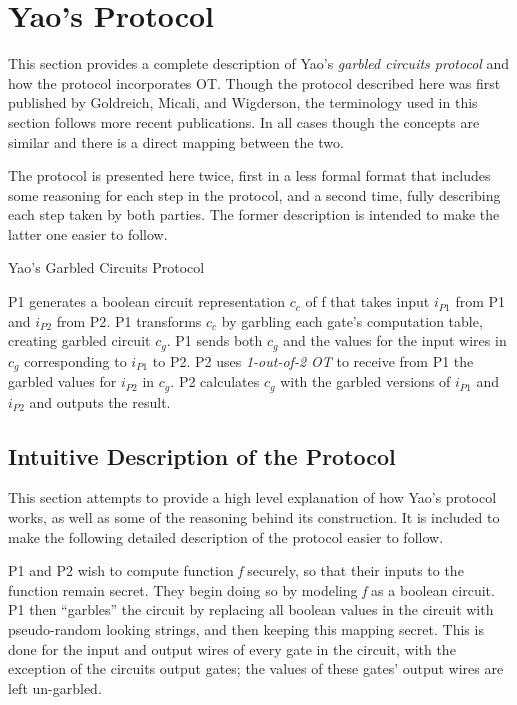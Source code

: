 \section{Yao's Protocol}
\label{sec:protocol}

This section provides a complete description of Yao's \emph{garbled circuits protocol} and how the protocol incorporates \ac{OT}.  Though the protocol described here was first published by Goldreich, Micali, and Wigderson\cite{goldreich1987play}, the terminology used in this section follows more recent publications\cite{hazay2010efficient}. In all cases though the concepts are similar and there is a direct mapping between the two.

The protocol is presented here twice, first in a less formal format that includes some reasoning for each step in the protocol, and a second time, fully describing each step taken by both parties. The former description is intended to make the latter one easier to follow.

\begin{algorithm}[H]
    \caption{Yao's Garbled Circuits Protocol}
    \label{alg:yao}
    \begin{algorithmic}[1]
        \STATE \ac{P1} generates a boolean circuit representation $c_c$ of \ac{f} that takes input $i_{P1}$ from \ac{P1} and $i_{P2}$ from \ac{P2}.
        \STATE \ac{P1} transforms $c_c$ by garbling each gate's computation table, creating garbled circuit $c_g$.
        \STATE \ac{P1} sends both $c_g$ and the values for the input wires in $c_g$ corresponding to $i_{P1}$ to \ac{P2}.
        \STATE \ac{P2} uses \emph{1-out-of-2 \ac{OT}} to receive from \ac{P1} the garbled values for $i_{P2}$ in $c_g$.
        \STATE \ac{P2} calculates $c_g$ with the garbled versions of $i_{P1}$ and $i_{P2}$ and outputs the result.
    \end{algorithmic}
\end{algorithm}

\subsection{Intuitive Description of the Protocol}

This section attempts to provide a high level explanation of how Yao's protocol works, as well as some of the reasoning behind its construction. It is included to make the following detailed description of the protocol easier to follow.

\ac{P1} and \ac{P2} wish to compute function \emph{f} securely, so that their inputs to the function remain secret. They begin doing so by modeling \emph{f} as a boolean circuit. \ac{P1} then ``garbles'' the circuit by replacing all boolean values in the circuit with pseudo-random looking strings, and then keeping this mapping secret.  This is done for the input and output wires of every gate in the circuit, with the exception of the circuits output gates; the values of these gates' output wires are left un-garbled.

